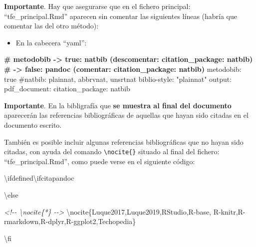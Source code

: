 \documentclass[12pt,a4paper,]{book}
\newenvironment{Shaded}{\begin{snugshade}}{\end{snugshade}}
\newcommand{\CommentTok}[1]{\textcolor[rgb]{0.56,0.35,0.01}{\textit{#1}}}
\newcommand{\FunctionTok}[1]{\textcolor[rgb]{0.13,0.29,0.53}{\textbf{#1}}}
\newcommand{\NormalTok}[1]{#1}
\providecommand{\tightlist}{%
  \setlength{\itemsep}{0pt}\setlength{\parskip}{0pt}}
\numberwithin{dummy}{section}
\theoremstyle{ocrenumbox}
\theoremstyle{blacknumex}
\theoremstyle{blacknumbox}
\theoremstyle{ocrenum}
\theoremstyle{ocrenum}
\begin{document}
\textbf{Importante}. Hay que asegurarse que en el fichero principal:
``tfe\_principal.Rmd'' aparecen sin comentar las siguientes líneas
(habría que comentar las del otro método):

\begin{itemize}
\tightlist
\item
  En la cabecera ``yaml'':
\end{itemize}

\footnotesize

\begin{Shaded}
\begin{Highlighting}[]
\FunctionTok{\# metodobib {-}\textgreater{} true: natbib (descomentar: citation\_package: natbib) }
\FunctionTok{\#           {-}\textgreater{} false: pandoc (comentar: citation\_package: natbib)}
\NormalTok{metodobib: true}
\NormalTok{\#natbib: plainnat, abbrvnat, unsrtnat}
\NormalTok{biblio{-}style: "plainnat"}
\NormalTok{output: }
\NormalTok{  pdf\_document: }
\NormalTok{    citation\_package: natbib}
\end{Highlighting}
\end{Shaded}

\normalsize

\textbf{Importante}. En la bibligrafía que \textbf{se muestra al final
del documento} aparecerán las referencias bibliográficas de aquellas que
hayan sido citadas en el documento escrito.

También es posible incluir algunas referencias bibliográficas que no
hayan sido citadas, con ayuda del comando
\texttt{\textbackslash{}nocite\{\}} situado al final del fichero:
``tfe\_principal.Rmd'', como puede verse en el siguiente código:

\footnotesize

\begin{Shaded}
\begin{Highlighting}[]
\NormalTok{\textbackslash{}ifdefined\textbackslash{}ifcitapandoc}

\NormalTok{\textbackslash{}else}

\CommentTok{\textless{}!{-}{-} \textbackslash{}nocite\{*\} {-}{-}\textgreater{}}
\NormalTok{\textbackslash{}nocite\{Luque2017,Luque2019,RStudio,R{-}base,}
\NormalTok{R{-}knitr,R{-}rmarkdown,R{-}dplyr,R{-}ggplot2,Techopedia\}}

\NormalTok{\textbackslash{}fi }
\end{Highlighting}
\end{Shaded}

\normalsize
\end{document}

